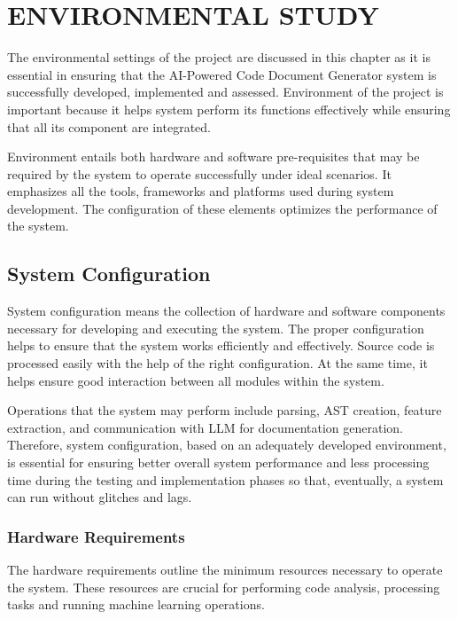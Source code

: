 \chapter{ENVIRONMENTAL STUDY}

\hspace{0.5cm}
The environmental settings of the project are discussed in this chapter as it is essential in ensuring that the AI-Powered Code Document Generator system is successfully developed, implemented and assessed. Environment of the project is important because it helps system perform its functions effectively while ensuring that all its component are integrated. 

Environment entails both hardware and software pre-requisites that may be required by the system to operate successfully under ideal scenarios. It emphasizes all the tools, frameworks and platforms used during system development. The configuration of these elements optimizes the performance of the system. 

\section{System Configuration}
\hspace{0.5cm}
System configuration means the collection of hardware and software components necessary for developing and executing the system. The proper configuration helps to ensure that the system works efficiently and effectively. Source code is processed easily with the help of the right configuration. At the same time, it helps ensure good interaction between all modules within the system.

Operations that the system may perform include parsing, AST creation, feature extraction, and communication with LLM for documentation generation. Therefore, system configuration, based on an adequately developed environment, is essential for ensuring better overall system performance and less processing time during the testing and implementation phases so that, eventually, a system can run without glitches and lags. 

\subsection{Hardware Requirements}
\hspace{0.5cm}
The hardware requirements outline the minimum resources necessary to operate the system. These resources are crucial for performing code analysis, processing tasks and running machine learning operations.

